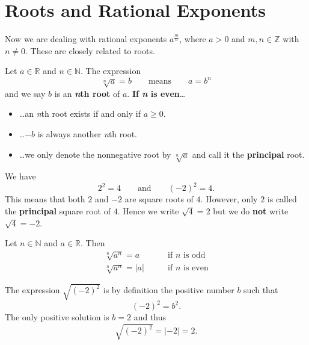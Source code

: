 \section{Roots and Rational Exponents}
Now we are dealing with rational exponents $a^{\frac{m}{n}}$, where $a>0$ and $m,n\in\mathbb Z$ with $n\neq 0$.
These are closely related to roots.
\begin{tcolorbox}
	Let $a\in\mathbb R$ and $n\in\mathbb N$. The expression
	\begin{equation*}
		\sqrt[n]{a}=b\qquad\text{means}\qquad a=b^n
	\end{equation*}
	and we say $b$ is an \textbf{\textit{n}th root} of $a$.
	\textbf{If \textit{n} is even}\ldots
	\begin{itemize}
		\item \ldots an \textit{n}th root exists if and only if $a\geq 0$.
		\item \ldots $-b$ is always another \textit{n}th root.
		\item \ldots we only denote the nonnegative root by $\sqrt[n]{a}$ and call it the \textbf{principal} root.
	\end{itemize}
\end{tcolorbox}
\begin{example}
	We have
	\begin{equation*}
		2^2=4\qquad\text{and}\qquad\left(-2\right)^2=4.
	\end{equation*}
	This means that both $2$ and $-2$ are square roots of $4$.
	However, only $2$ is called the \textbf{principal} square root of $4$.
	Hence we write $\sqrt{4}=2$ but we do \textbf{not} write $\sqrt{4}=-2$.
\end{example}
\begin{tcolorbox}
	Let $n\in\mathbb N$ and $a\in\mathbb R$. Then
	\begin{align*}
		\sqrt[n]{a^n}=a&\qquad\text{if }n\text{ is odd} \\
		\sqrt[n]{a^n}=\lvert a\rvert&\qquad\text{if }n\text{ is even}
	\end{align*}
\end{tcolorbox}
\begin{example}
	The expression $\sqrt{\left(-2\right)^2}$ is by definition the positive number $b$ such that 
	\begin{equation*}
		\left(-2\right)^2=b^2.
	\end{equation*}
	The only positive solution is $b=2$ and thus
	\begin{equation*}
		\sqrt{\left(-2\right)^2}=\lvert -2\rvert=2.
	\end{equation*}
\end{example}
